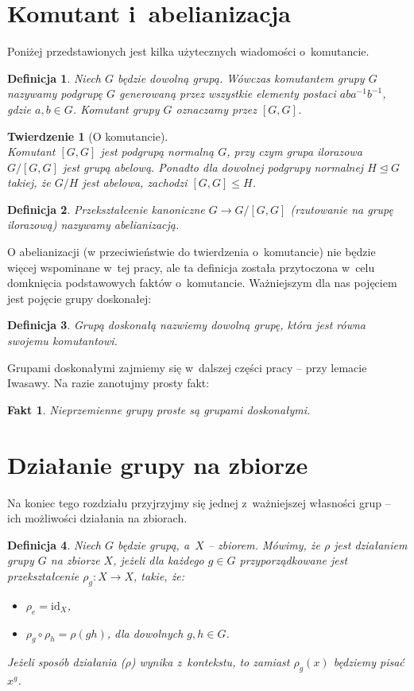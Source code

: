\documentclass[licencjacka]{pracamgr}
\newtheorem{deff}{Definicja}[section]
\newtheorem{thh}{Twierdzenie}[section]
\newtheorem{fact}{Fakt}[section]
\begin{document}
\section{Komutant i~abelianizacja}
Poniżej przedstawionych jest kilka użytecznych wiadomości o~komutancie.
\begin{deff}
	Niech $G$ będzie dowolną grupą. Wówczas \emph{komutantem grupy $G$} nazywamy podgrupę $G$ generowaną przez wszystkie elementy postaci
	$aba^{-1}b^{-1}$, gdzie $a, b \in G$. Komutant grupy $G$ oznaczamy przez $[G, G]$.
\end{deff}
\begin{thh}[O komutancie] $ $\\
	Komutant $[G,G]$ jest podgrupą normalną $G$, przy czym grupa ilorazowa $G/[G,G]$ jest grupą abelową.
	Ponadto dla dowolnej podgrupy normalnej $H \trianglelefteq G$ takiej, że $G/H$ jest abelowa, zachodzi $[G,G] \le H$.
\end{thh}
\begin{deff}  
	Przekształcenie kanoniczne $G \to G/[G,G]$ (rzutowanie na grupę ilorazową) nazywamy abelianizacją.
\end{deff}

O abelianizacji (w przeciwieństwie do twierdzenia o~komutancie) nie będzie więcej wspominane w~tej pracy, 
ale ta definicja została przytoczona w~celu domknięcia podstawowych faktów o~komutancie.
Ważniejszym dla nas pojęciem jest pojęcie grupy doskonałej:

\begin{deff}
	\emph{Grupą doskonałą} nazwiemy dowolną grupę, która jest równa swojemu komutantowi.
\end{deff}

Grupami doskonałymi zajmiemy się w~dalszej części pracy -- przy lemacie Iwasawy.
Na razie zanotujmy prosty fakt:

\begin{fact}
	Nieprzemienne grupy proste są grupami doskonałymi.
\end{fact}


\section{Działanie grupy na zbiorze}
Na koniec tego rozdziału przyjrzyjmy się jednej z~ważniejszej własności grup -- ich możliwości działania na zbiorach.

\begin{deff}
 	Niech $G$ będzie grupą, a~$X$ -- zbiorem. Mówimy, że \emph{$\rho$ jest działaniem grupy $G$ na zbiorze $X$}, 
	jeżeli dla każdego $g \in G$ przyporządkowane jest przekształcenie $\rho_g\colon X \to X$, takie, że:
	\begin{itemize}
		\item $\rho_e = \mathrm{id}_X$,
		\item $\rho_g \circ \rho_h = \rho(gh)$, dla dowolnych $g, h \in G$.
	\end{itemize}
	Jeżeli sposób działania ($\rho$) wynika z~kontekstu, to zamiast $\rho_g(x)$ będziemy pisać $x^g$.
\end{deff}
\end{document}
